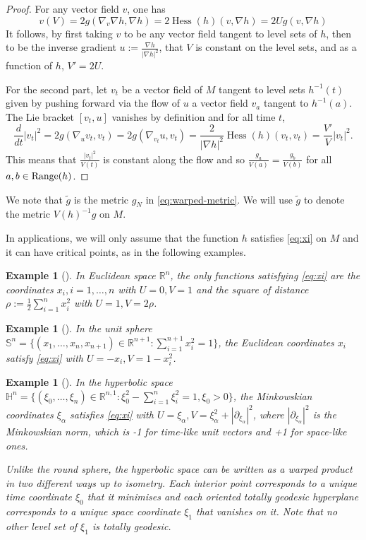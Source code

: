 \documentclass[11pt]{article}
\newtheorem{exampl}[theorem]{Example}
\DeclareMathOperator{\hess}{Hess}
\begin{document}
\begin{proof}
For any vector field \(v\), one has 
\[
 v(V) = 2 g(\nabla_v \nabla h, \nabla h)= 2 \hess(h)(v, \nabla h) = 2U g(v, \nabla h)
\]
It follows, by first taking \(v\) to be any vector field tangent to level
sets of \(h\), then to be the inverse gradient \(u:= \frac{\nabla h}{|\nabla h|^2}\), that
\(V\) is constant on the level sets, and as a function of \(h\), \(V' = 2U\).

For the second part, let \(v_t\) be a vector field of \(M\) tangent to level sets \(h^{-1}(t)\) given by 
pushing forward via the flow of \(u\) a vector field \(v_a\) tangent to \(h^{-1}(a)\). The Lie bracket \([v_t, u]\)
vanishes by definition and for all time \(t\),
\[
 \frac{d}{dt}|v_t|^2 = 2 g(\nabla_u v_t, v_t) = 2 g(\nabla_{v_t}u, v_t) =
\frac{2}{|\nabla h|^2}\hess(h)(v_t, v_t) = \frac{V'}{V}|v_t|^2.
\]
This means that \(\frac{|v_t|^2}{V(t)}\) is constant along the flow and so \(\frac{g_a}{V(a)} = \frac{g_b}{V(b)}\) for all \(a,b\in {\rm Range}(h)\).
\end{proof}

We note that \(\tilde g\) is the metric \(g_N\) in \eqref{eq:warped-metric}. We will use
\(\tilde g\) to denote the metric \(V(h)^{-1}g\) on \(M\). 

In applications, we will only assume that the function \(h\) satisfies
\eqref{eq:xi} on \(M\) and it can have critical points, as in the following examples.

\begin{exampl}[]
\label{ex:xi-R}
In Euclidean space \(\mathbb{R}^n\), the only functions satisfying
   \eqref{eq:xi} are the coordinates \(x_i, i=1,\dots,n\) with \(U=0, V=1\) and the square of distance \(\rho := \frac{1}{2}\sum_{i=1}^n
   x_i^2\) with \(U= 1, V = 2\rho\).
\end{exampl}

\begin{exampl}[]
\label{ex:xi-S}
In the unit sphere \(\mathbb{S}^n = \{(x_1,\dots, x_n, x_{n+1})\in
\mathbb{R}^{n+1}:\sum_{i=1}^{n+1} x_i^2 = 1\}\), the Euclidean coordinates \(x_i\)
 satisfy \eqref{eq:xi} with \(U = -x_i, V = 1-x_i^2\). 
\end{exampl}

\begin{exampl}[]
\label{ex:xi-H}
In the hyperbolic space \(\mathbb{H}^n=\{(\xi_0,\dots,\xi_n)\in \mathbb{R}^{n,1}:
   \xi_0^2 - \sum_{i=1}^n\xi_i^2=1, \xi_0 > 0\}\), the Minkowskian coordinates \(\xi_\alpha\) satisfies
   \eqref{eq:xi} with \(U=\xi_\alpha, V = \xi_\alpha^2 + |\partial_{\xi_\alpha}|^2\),
   where  \(|\partial_{\xi_\alpha}|^2\) is the Minkowskian norm, which is -1 for
   time-like unit
   vectors and +1 for space-like ones.

Unlike the round sphere, the hyperbolic space can be written as a warped
product in two different ways up to isometry. Each interior point corresponds to a
unique time coordinate \(\xi_0\) that it minimises and 
each oriented totally geodesic hyperplane
corresponds to a unique space coordinate \(\xi_1\) that
vanishes on it. Note that no other level set of \(\xi_1\) is totally
geodesic.
\end{exampl}
\end{document}
